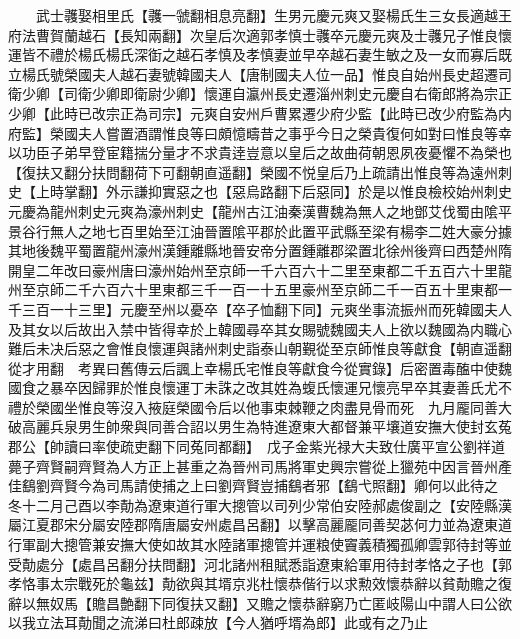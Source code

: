 　　武士彠娶相里氏【彠一虢翻相息亮翻】生男元慶元爽又娶楊氏生三女長適越王府法曹賀蘭越石【長知兩翻】次皇后次適郭孝慎士彠卒元慶元爽及士彠兄子惟良懷運皆不禮於楊氏楊氏深衘之越石孝慎及孝慎妻並早卒越石妻生敏之及一女而寡后既立楊氏號榮國夫人越石妻號韓國夫人【唐制國夫人位一品】惟良自始州長史超遷司衛少卿【司衛少卿即衛尉少卿】懷運自瀛州長史遷淄州刺史元慶自右衛郎將為宗正少卿【此時已改宗正為司宗】元爽自安州戶曹累遷少府少監【此時已改少府監為内府監】榮國夫人嘗置酒謂惟良等曰頗憶疇昔之事乎今日之榮貴復何如對曰惟良等幸以功臣子弟早登宦籍揣分量才不求貴逹豈意以皇后之故曲荷朝恩夙夜憂懼不為榮也【復扶又翻分扶問翻荷下可翻朝直遥翻】榮國不悦皇后乃上疏請出惟良等為遠州刺史【上時掌翻】外示謙抑實惡之也【惡烏路翻下后惡同】於是以惟良檢校始州刺史元慶為龍州刺史元爽為濠州刺史【龍州古江油秦漢曹魏為無人之地鄧艾伐蜀由隂平景谷行無人之地七百里始至江油晉置隂平郡於此置平武縣至梁有楊李二姓大豪分據其地後魏平蜀置龍州濠州漢鍾離縣地晉安帝分置鍾離郡梁置北徐州後齊曰西楚州隋開皇二年改曰豪州唐曰濠州始州至京師一千六百六十二里至東都二千五百六十里龍州至京師二千六百六十里東都三千一百一十五里豪州至京師二千一百五十里東都一千三百一十三里】元慶至州以憂卒【卒子恤翻下同】元爽坐事流振州而死韓國夫人及其女以后故出入禁中皆得幸於上韓國尋卒其女賜號魏國夫人上欲以魏國為内職心難后未决后惡之會惟良懷運與諸州刺史詣泰山朝覲從至京師惟良等獻食【朝直遥翻從才用翻　考異曰舊傳云后諷上幸楊氏宅惟良等獻食今從實錄】后密置毒醢中使魏國食之暴卒因歸罪於惟良懷運丁未誅之改其姓為蝮氏懷運兄懷亮早卒其妻善氏尤不禮於榮國坐惟良等沒入掖庭榮國令后以他事束棘鞭之肉盡見骨而死　九月龎同善大破高麗兵泉男生帥衆與同善合詔以男生為特進遼東大都督兼平壤道安撫大使封玄菟郡公【帥讀曰率使疏吏翻下同菟同都翻】　戊子金紫光禄大夫致仕廣平宣公劉祥道薨子齊賢嗣齊賢為人方正上甚重之為晉州司馬將軍史興宗嘗從上獵苑中因言晉州產佳鷂劉齊賢今為司馬請使捕之上曰劉齊賢豈捕鷂者邪【鷂弋照翻】卿何以此待之　冬十二月己酉以李勣為遼東道行軍大摠管以司列少常伯安陸郝處俊副之【安陸縣漢屬江夏郡宋分屬安陸郡隋唐屬安州處昌呂翻】以擊高麗龎同善契苾何力並為遼東道行軍副大摠管兼安撫大使如故其水陸諸軍摠管并運粮使竇義積獨孤卿雲郭待封等並受勣處分【處昌呂翻分扶問翻】河北諸州租賦悉詣遼東給軍用待封孝恪之子也【郭孝恪事太宗戰死於龜兹】勣欲與其壻京兆杜懷恭偕行以求勲效懷恭辭以貧勣贍之復辭以無奴馬【贍昌艶翻下同復扶又翻】又贍之懷恭辭窮乃亡匿岐陽山中謂人曰公欲以我立法耳勣聞之流涕曰杜郎疎放【今人猶呼壻為郎】此或有之乃止

